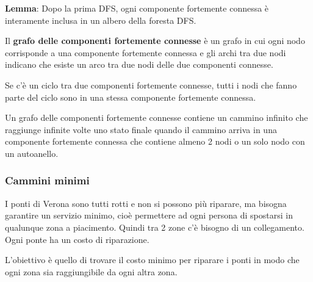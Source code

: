 \documentclass[a4paper]{article}
\begin{document}
\vspace{1em}
\noindent
\textbf{Lemma}: Dopo la prima DFS, ogni componente fortemente connessa è interamente
inclusa in un albero della foresta DFS.

\vspace{1em}
\noindent
Il \textbf{grafo delle componenti fortemente connesse} è un grafo in cui ogni nodo corrisponde
a una componente fortemente connessa e gli archi tra due nodi indicano che esiste un
arco tra due nodi delle due componenti connesse.

Se c'è un ciclo tra due componenti fortemente connesse, tutti i nodi che fanno parte 
del ciclo sono in una stessa componente fortemente connessa.

\vspace{1em}
\noindent
Un grafo delle componenti fortemente connesse contiene un cammino infinito che raggiunge
infinite volte uno stato finale quando il cammino arriva in una componente fortemente
connessa che contiene almeno 2 nodi o un solo nodo con un autoanello.

\subsubsection{Cammini minimi}
I ponti di Verona sono tutti rotti e non si possono più riparare, ma bisogna garantire
un servizio minimo, cioè permettere ad ogni persona di spostarsi in qualunque zona a
piacimento. Quindi tra 2 zone c'è bisogno di un collegamento. Ogni ponte ha un costo
di riparazione.

L'obiettivo è quello di trovare il costo minimo per riparare i ponti in modo che
ogni zona sia raggiungibile da ogni altra zona.
\end{document}
